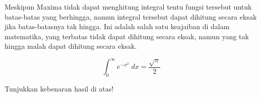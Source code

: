 \documentclass[a4paper,11pt,oneside,enabledeprecatedfontcommands]{scrbook}
\newenvironment{eulernotebook}{}{}
\newenvironment{eulercomment}{\par\medskip\noindent}{\par\medskip}
\newenvironment{eulerformula}{}{}
\begin{document}
\begin{eulernotebook}
\begin{eulercomment}
Meskipun Maxima tidak dapat menghitung integral tentu fungsi tersebut untuk batas-batas yang berhingga, namun integral tersebut dapat dihitung secara eksak jika batas-batasnya tak hingga. Ini adalah salah satu keajaiban di dalam matematika, yang terbatas tidak dapat dihitung secara eksak, namun yang tak hingga malah dapat dihitung secara eksak.
\end{eulercomment}
\begin{eulerformula}
\[
\int_{0}^{\infty }{e^ {- x^2 }\;dx}=\frac{\sqrt{\pi}}{2}
\]
\end{eulerformula}
\begin{eulercomment}
Tunjukkan kebenaran hasil di atas!


\end{eulercomment}
\end{eulernotebook}
\end{document}
